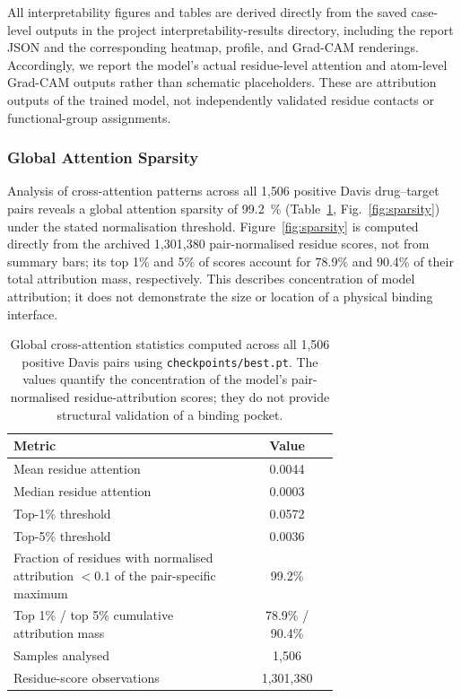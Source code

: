 \documentclass[fleqn,10pt]{wlscirep}
\begin{document}
All interpretability figures and tables are derived directly from the saved
case-level outputs in the project interpretability-results directory, including
the report JSON and the corresponding heatmap, profile, and Grad-CAM renderings.
Accordingly, we report the model's actual residue-level attention and atom-level
Grad-CAM outputs rather than schematic placeholders.  These are attribution
outputs of the trained model, not independently validated residue contacts or
functional-group assignments.

\subsubsection{Global Attention Sparsity}

Analysis of cross-attention patterns across all 1{,}506 positive Davis
drug--target pairs
reveals a global attention sparsity of \SI{99.2}{\percent}
(Table~\ref{tab:global_attn}, Fig.~\ref{fig:sparsity}) under the stated
normalisation threshold. Figure~\ref{fig:sparsity} is computed directly from
the archived 1{,}301{,}380 pair-normalised residue scores, not from summary
bars; its top 1\% and 5\% of scores account for 78.9\% and 90.4\% of their
total attribution mass, respectively. This describes concentration of model
attribution; it does not demonstrate the size or location of a physical binding
interface.

\begin{table}[htbp]
\centering
\caption{Global cross-attention statistics computed across all 1{,}506 positive
  Davis pairs using \texttt{checkpoints/best.pt}. The values quantify the
  concentration of the model's pair-normalised
  residue-attribution scores; they do not provide structural validation of a
  binding pocket.}
\label{tab:global_attn}
\begin{tabular}{p{0.72\linewidth}c}
\toprule
\textbf{Metric} & \textbf{Value} \\
\midrule
Mean residue attention      & 0.0044 \\
Median residue attention    & 0.0003 \\
Top-1\% threshold           & 0.0572 \\
Top-5\% threshold           & 0.0036 \\
Fraction of residues with normalised attribution $<0.1$ of the pair-specific maximum & 99.2\% \\
Top 1\% / top 5\% cumulative attribution mass & 78.9\% / 90.4\% \\
Samples analysed            & 1{,}506 \\
Residue-score observations   & 1{,}301{,}380 \\
\bottomrule
\end{tabular}
\end{table}
\end{document}
